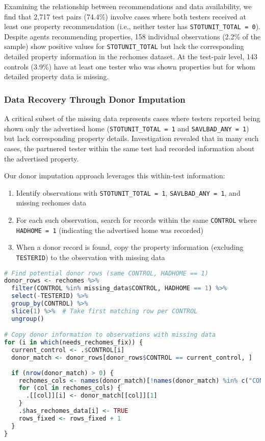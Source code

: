 \documentclass{article}
\begin{document}
Examining the relationship between recommendations and data availability, we find that 2,717 test pairs (74.4\%) involve cases where both testers received at least one property recommendation (i.e., neither tester has \texttt{STOTUNIT\_TOTAL = 0}). Despite agents recommending properties, 158 individual observations (2.2\% of the sample) show positive values for \texttt{STOTUNIT\_TOTAL} but lack the corresponding detailed property information in the rechomes dataset. At the test-pair level, 143 controls (3.9\%) have at least one tester who was shown properties but for whom detailed property data is missing.

\subsubsection{Data Recovery Through Donor Imputation}

A critical subset of the missing data represents cases where testers reported being shown only the advertised home (\texttt{STOTUNIT\_TOTAL = 1} and \texttt{SAVLBAD\_ANY = 1}) but lack corresponding property details. Investigation revealed that in many such cases, the partnered tester within the same test had recorded information about the advertised property.

Our donor imputation approach leverages this within-test information:
\begin{enumerate}
\item Identify observations with \texttt{STOTUNIT\_TOTAL = 1}, \texttt{SAVLBAD\_ANY = 1}, and missing rechomes data
\item For each such observation, search for records within the same \texttt{CONTROL} where \texttt{HADHOME = 1} (indicating the advertised home was recorded)
\item When a donor record is found, copy the property information (excluding \texttt{TESTERID}) to the observation with missing data
\end{enumerate}

\begin{lstlisting}[language=R]
# Find potential donor rows (same CONTROL, HADHOME == 1)
donor_rows <- rechomes %>%
  filter(CONTROL %in% missing_data$CONTROL, HADHOME == 1) %>%
  select(-TESTERID) %>%
  group_by(CONTROL) %>%
  slice(1) %>%  # Take first matching row per CONTROL
  ungroup()

# Copy donor information to observations with missing data
for (i in which(needs_rechomes_fix)) {
  current_control <- .$CONTROL[i]
  donor_match <- donor_rows[donor_rows$CONTROL == current_control, ]
  
  if (nrow(donor_match) > 0) {
    rechomes_cols <- names(donor_match)[!names(donor_match) %in% c("CONTROL")]
    for (col in rechomes_cols) {
      .[[col]][i] <- donor_match[[col]][1]
    }
    .$has_rechomes_data[i] <- TRUE
    rows_fixed <- rows_fixed + 1
  }
}
\end{lstlisting}
\end{document}
